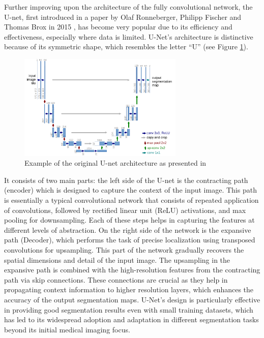 Further improving upon the architecture of the fully convolutional network, the U-net, first introduced in a paper by Olaf Ronneberger, Philipp Fischer and Thomas Brox in 2015 \cite{DBLP:journals/corr/RonnebergerFB15}, has become very popular due to its efficiency and effectiveness, especially where data is limited. U-Net's architecture is distinctive because of its symmetric shape, which resembles the letter ``U'' (see Figure \ref{fig:u-netarch}). 
\begin{figure}
    \centering 
    \includegraphics[width=0.7\textwidth]{u-net-illustration-correct-scale2.pdf}
    \caption{Example of the original U-net architecture as presented in \cite{DBLP:journals/corr/RonnebergerFB15}}
    \label{fig:u-netarch}
\end{figure}
It consists of two main parts: the left side of the U-net is the contracting path (encoder) which is designed to capture the context of the input image. This path is essentially a typical convolutional network that consists of repeated application of convolutions, followed by rectified linear unit (ReLU) activations, and max pooling for downsampling. Each of these steps helps in capturing the features at different levels of abstraction. On the right side of the network is the expansive path (Decoder), which performs the task of precise localization using transposed convolutions for upsampling. This part of the network gradually recovers the spatial dimensions and detail of the input image. The upsampling in the expansive path is combined with the high-resolution features from the contracting path via skip connections. These connections are crucial as they help in propagating context information to higher resolution layers, which enhances the accuracy of the output segmentation maps. U-Net's design is particularly effective in providing good segmentation results even with small training datasets, which has led to its widespread adoption and adaptation in different segmentation tasks beyond its initial medical imaging focus.

